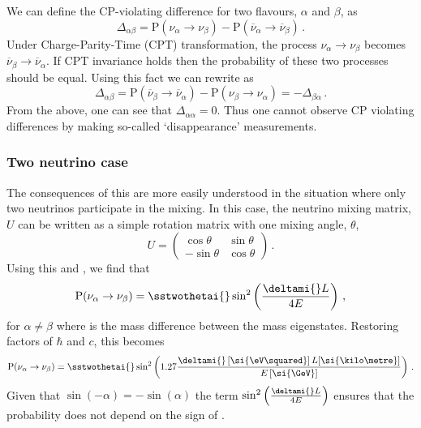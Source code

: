 We can define the CP-violating difference for two flavours, $\alpha$ and $\beta$, as
\begin{equation}
  \Delta_{\alpha \beta} = \text{P}(\nu_{\alpha} \rightarrow \nu_{\beta}) - \text{P}(\overline{\nu}_{\alpha} \rightarrow \overline{\nu}_{\beta}) \, .
  \label{eq:cpViolation}
\end{equation}
Under Charge-Parity-Time (CPT) transformation, the process $\nu_{\alpha} \rightarrow \nu_{\beta}$ becomes $\overline{\nu}_{\beta} \rightarrow \overline{\nu}_{\alpha}$.
If CPT invariance holds then the probability of these two processes should be equal.
Using this fact we can rewrite  as
\begin{equation}
  \Delta_{\alpha \beta} = \text{P}(\overline{\nu}_{\beta} \rightarrow \overline{\nu}_{\alpha}) - \text{P}(\nu_{\beta} \rightarrow \nu_{\alpha}) = -\Delta_{\beta \alpha} \, .
\end{equation}
From the above, one can see that $\Delta_{\alpha \alpha} = 0$.
Thus one cannot observe CP violating differences by making so-called `disappearance' measurements.
  
\subsubsection{Two neutrino case}
\label{sec:theory:theory:twoNeutrino}

The consequences of this are more easily understood in the situation where only two neutrinos participate in the mixing.
In this case, the neutrino mixing matrix, $U$ can be written as a simple rotation matrix with one mixing angle, $\theta$,
\begin{equation}
  U =
  \begin{pmatrix}
    \cos\theta  & \sin\theta \\
    -\sin\theta & \cos\theta
  \end{pmatrix} \, .
\end{equation}
Using this and , we find that
\begin{equation}
  \text{P}(\nu_{\alpha}\rightarrow\nu_{\beta}) = \sstwothetai{} \sin^{2} \left(\frac{\deltami{} L}{4E} \right) \, ,
\end{equation}
for $\alpha \neq \beta$ where \deltami{} is the mass difference between the mass eigenstates.
Restoring factors of $\hbar$ and $c$, this becomes
\begin{equation}
  \text{P}(\nu_{\alpha}\rightarrow\nu_{\beta}) = \sstwothetai{} \sin^{2} \left( 1.27 \frac{\deltami{} \left[\si{\eV\squared}\right] L [\si{\kilo\metre}]}{E\left[\si{\GeV}\right]} \right) \, .
  \label{eq:twoNuProb}
\end{equation}
Given that $\sin(-\alpha) = -\sin(\alpha)$ the term $\sin^{2} \left(\frac{\deltami{} L}{4E} \right)$ ensures that the probability does not depend on the sign of \deltami{}.

